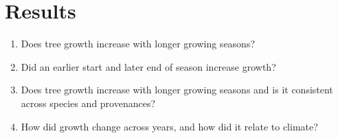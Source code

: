 \clearpage
\section*{Results}
\begin{enumerate}
\item Does tree growth increase with longer growing seasons?
\item Did an earlier start and later end of season increase growth? 
\item Does tree growth increase with longer growing seasons and is it consistent across species and provenances?
\item How did growth change across years, and how did it relate to climate? \\
\end{enumerate}

